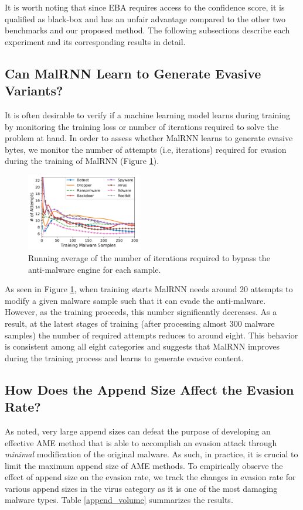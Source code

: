 \documentclass[letterpaper]{article}
\newcommand{\malrnn}{M\lowercase{a}lRNN }
\begin{document}
It is worth noting that since EBA requires access to the confidence score, it is qualified as black-box and has an unfair advantage compared to the other two benchmarks and our proposed method. The following subsections describe each experiment and its corresponding results in detail.

\subsection{Can \malrnn Learn to Generate Evasive Variants?}
 It is often desirable to verify if a machine learning model learns during training by monitoring the training loss or number of iterations required to solve the problem at hand. In order to assess whether \malrnn learns to generate evasive bytes, we monitor the number of attempts (i.e, iterations) required for evasion during the training of \malrnn (Figure \ref{training_iterations}).
 
 \begin{figure}[h]
        \includegraphics[width=0.45\textwidth]{Training_Iteration_Illustration.png}
        \caption{Running average of the number of iterations required to bypass the anti-malware engine for each sample.}
    \label{training_iterations}
\end{figure}

 As seen in Figure \ref{training_iterations}, when training starts \malrnn needs around 20 attempts to modify a given malware sample such that it can evade the anti-malware. However, as the training proceeds, this number significantly decreases. As a result, at the latest stages of training (after processing almost 300 malware samples) the number of required attempts reduces to around eight. This behavior is consistent among all eight categories and suggests that \malrnn improves during the training process and learns to generate evasive content. 

\subsection{How Does the Append Size Affect the Evasion Rate?}
As noted, very large append sizes can defeat the purpose of developing an effective AME method that is able to accomplish an evasion attack through \textit{minimal} modification of the original malware. As such, in practice, it is crucial to limit the maximum append size of AME methods. To empirically observe the effect of append size on the evasion rate, we track the changes in evasion rate for various append sizes in the virus category as it is one of the most damaging malware types. Table \ref{append_volume} summarizes the results.  
\end{document}
